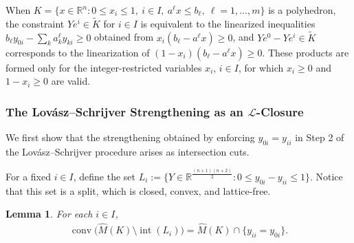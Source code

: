 \documentclass{article}
\newtheorem{lemma}{Lemma}
\newcommand{\R}{\mathbb{R}}
\renewcommand{\L}{\mathcal{L}}
\begin{document}
When $K =  \{x \in \R^n : 0 \leq x_i \leq 1,\ i \in I,\ a^\ell x \leq b_\ell,\ \ell = 1,\ldots,m\}$ is a polyhedron, the constraint $Ye^i \in \tilde K$ for $i \in I$ is equivalent to the linearized inequalities $b_\ell y_{0i} - \sum_k a^\ell_k y_{ki} \geq 0$ obtained from $x_i(b_\ell - a^\ell x) \geq 0$, and $Ye^0 - Ye^i \in \tilde K$ corresponds to the linearization of $(1-x_i)(b_\ell - a^\ell x) \geq 0$. These products are formed only for the integer-restricted variables $x_i$, $i \in I$, for which $x_i \geq 0$ and $1 - x_i \geq 0$ are valid.

\subsubsection{The Lov\'asz--Schrijver Strengthening as an \texorpdfstring{$\L$}{L}-Closure} \label{subsec:ls-as-intersection}

We first show that the strengthening obtained by enforcing $y_{0i} = y_{ii}$ in Step 2 of the Lov\'asz--Schrijver procedure arises as intersection cuts.

For a fixed $i \in I$, define the set $L_i := \{Y \in \R^{\frac{(n+1)(n+2)}{2}} : 0 \leq y_{0i} - y_{ii} \leq 1\}$.
Notice that this set is a split, which is closed, convex, and lattice-free.

\begin{lemma} \label{lemma:ls-first-strengthen}
    For each $i \in I$,
    \begin{align}
        \operatorname{conv}\bigl(\hat M(K) \setminus \operatorname{int}(L_i)\bigr)
        = \hat M(K) \cap \{ y_{ii} = y_{0i}\}.
    \end{align}
\end{lemma}
\end{document}
